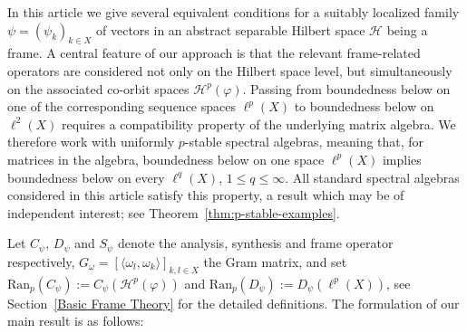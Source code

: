 \documentclass{amsart}
\def\Hil{\mathcal{H}}
\renewcommand{\H}{{\mathcal{H}}}
\begin{document}
In this article we give several equivalent conditions for a suitably localized family \(\psi=(\psi_k)_{k\in X}\) of vectors in an abstract separable Hilbert space \(\mathcal H\) being a frame. A central feature of our approach is that the relevant frame-related operators are considered not only on the Hilbert space level, but simultaneously on the associated co-orbit spaces \(\mathcal H^p(\varphi)\). Passing from boundedness below on one of the corresponding sequence spaces \(\ell^p(X)\) to boundedness below on \(\ell^2(X)\) requires a compatibility property of the underlying matrix algebra. We therefore work with uniformly $p$-stable spectral algebras, meaning that, for matrices in the algebra, boundedness below on one space \(\ell^p(X)\) implies boundedness below on every \(\ell^q(X)\), \(1\leq q\leq\infty\). All standard spectral algebras considered in this article satisfy this property, a result which may be of independent interest; see Theorem~\ref{thm:p-stable-examples}.

Let $C_\psi$, $D_\psi$ and $S_\psi$ denote the analysis, synthesis and frame operator respectively, $G_\omega = [\langle \omega_l, \omega_k \rangle ]_{k,l \in X}$ the Gram matrix, %
and set $\text{Ran}_p(C_\psi):=C_\psi(\H^p(\varphi))$ and $\text{Ran}_p(D_\psi):=D_\psi(\ell^p(X))$, see Section~\ref{Basic Frame Theory} for the detailed definitions. The formulation of our main result is as follows:
\end{document}
